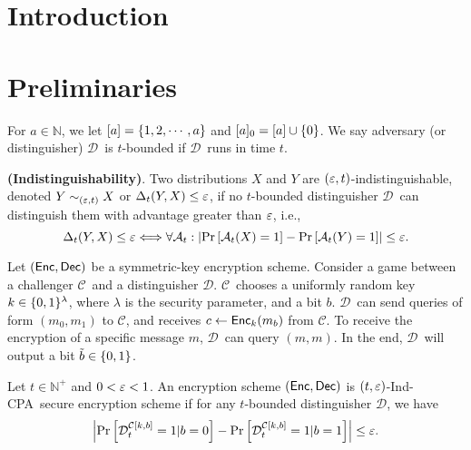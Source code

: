 \documentclass{article}
\newcommand{\tcpa}{$(t,\eps)$-Ind-CPA}
\def\a{${\mathcal D}$}
\def\ch{${\mathcal C}$}
\newcommand{\NN}{{\mathbb{N}}}
\begin{document}
\title{}
\author{}

\maketitle

\def \cF {\F}

\begin{abstract}
\end{abstract}

\section{Introduction}
\section{Preliminaries}

For $a\in \NN$, we let $[a]=\left\{ 1,2, \cdots, a \right\}$ and $[a]_0=[a]\cup \left\{ 0 \right\}$. We say adversary (or distinguisher) \a~is $t$-bounded if \a~runs in time $t$.%

\begin{definition}\textbf{(Indistinguishability)}. Two distributions $X$ and $Y$ are $(\varepsilon,t)$-indistinguishable, denoted $Y \sim_{(\varepsilon,t)} X$ or $\Delta_{t}(Y,X)\leq \varepsilon$, if  no $t$-bounded distinguisher \a~can distinguish them with advantage greater than $\varepsilon$, i.e., \[ \Delta_{t}(Y,X)\leq \varepsilon \Longleftrightarrow \forall \mathcal{A}_t : \left| \Pr \left[ \mathcal{A}_t(X)=1 \right]-\Pr \left[ \mathcal{A}_t(Y)=1 \right]  \right|\leq \varepsilon. \]
\end{definition}

Let $({\sf Enc},{\sf Dec})$ be a symmetric-key encryption scheme. Consider a game between a challenger \ch~and a distinguisher \a. \ch~chooses a uniformly random key $k\in \{0,1\}^\lambda$, where $\lambda$ is the security parameter, and a bit $b$. \a~can send queries of form $(m_0,m_1)$ to \ch, and receives $c\leftarrow {\sf Enc}_k(m_b)$ from \ch. To receive the encryption of a specific message $m$, \a~can query $(m,m)$. In the end, \a~will output a bit $\tilde{b}\in \{0,1\}$. 

\begin{definition} Let $t \in \NN^+$ and $0<\varepsilon <1$. An encryption scheme $({\sf Enc},{\sf Dec})$ is \tcpa~secure encryption scheme if for any $t$-bounded distinguisher \a, we have $$\left| \Pr \left[ \mathcal{D}_t^{\mathcal{C}[k,b]}=1|b=0 \right] - \Pr \left[ \mathcal{D}_t^{\mathcal{C}[k,b]}=1|b=1 \right]  \right|\leq \varepsilon.$$
\end{definition}
\end{document}
